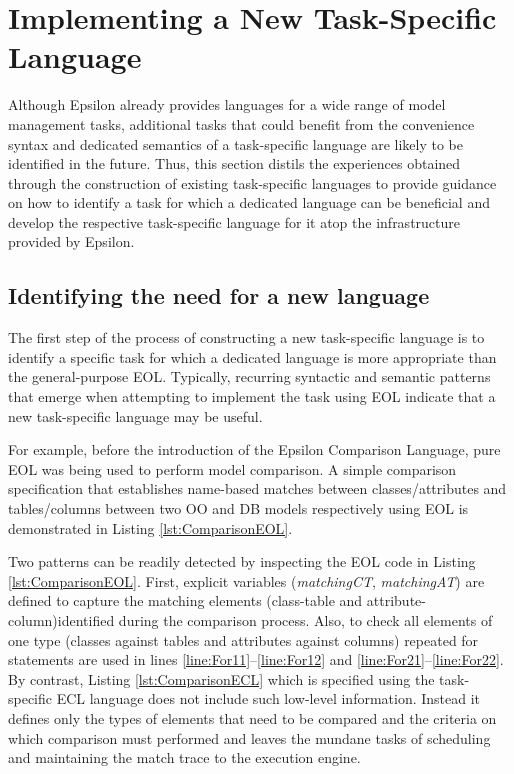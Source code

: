 \chapter{Implementing a New Task-Specific Language}
\label{sec:Design.ImplementingANewLanguage}

Although Epsilon already provides languages for a wide range of model management tasks, additional tasks that could benefit from the convenience syntax and dedicated semantics of a task-specific language are likely to be identified in the future. Thus, this section distils the experiences obtained through the construction of existing task-specific languages to provide guidance on how to identify a task for which a dedicated language can be beneficial and develop the respective task-specific language for it atop the infrastructure provided by Epsilon.

\section{Identifying the need for a new language}

The first step of the process of constructing a new task-specific language is to identify a specific task for which a dedicated language is more appropriate than the general-purpose EOL. Typically, recurring syntactic and semantic patterns that emerge when attempting to implement the task using EOL indicate that a new task-specific language may be useful.

For example, before the introduction of the Epsilon Comparison Language, pure EOL was being used to perform model comparison. A simple comparison specification that establishes name-based matches between classes/attributes and tables/columns between two OO and DB models respectively using EOL is demonstrated in Listing \ref{lst:ComparisonEOL}.

Two patterns can be readily detected by inspecting the EOL code in Listing \ref{lst:ComparisonEOL}. First, explicit variables (\emph{matchingCT}, \emph{matchingAT}) are defined to capture the matching elements (class-table and attribute-column)identified during the comparison process. Also, to check all elements of one type (classes against tables and attributes against columns) repeated for statements are used in lines \ref{line:For11}--\ref{line:For12} and \ref{line:For21}--\ref{line:For22}. By contrast, Listing \ref{lst:ComparisonECL} which is specified using the task-specific ECL language does not include such low-level information. Instead it defines only the types of elements that need to be compared and the criteria on which comparison must performed and leaves the mundane tasks of scheduling and maintaining the match trace to the execution engine.

